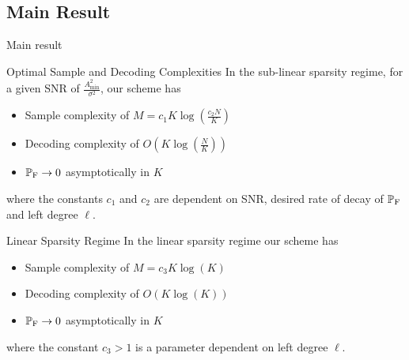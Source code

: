 \documentclass[10pt]{beamer}
\begin{document}
\subsection{Main Result}
\begin{frame}{Main result}

\begin{block}{Optimal Sample and Decoding Complexities}
In the sub-linear sparsity regime, for a given SNR of $\frac{A^{2}_{\text{min}}}{\sigma^{2}}$, our scheme has 
\begin{itemize}
\item Sample complexity of $M=c_1 K\log (\frac{c_2 N}{K})$
\item Decoding complexity of $O\left(K\log(\frac{N}{K})\right)$ 
\item $\mathbb{P}_{\text{F}}\rightarrow 0$ asymptotically in $K$
\end{itemize} 
where the constants $c_{1}$ and $c_{2}$ are dependent on SNR, desired rate of decay of $\mathbb{P}_{\text{F}}$ and left degree $\ell$.
\end{block}
\begin{block}{Linear Sparsity Regime}
In the linear sparsity regime our scheme has 
\begin{itemize}
\item Sample complexity of $M=c_3 K\log (K)$
\item Decoding complexity of $O\left(K\log(K)\right)$ 
\item $\mathbb{P}_{\text{F}}\rightarrow 0$ asymptotically in $K$
\end{itemize} 
where the constant $c_{3}>1$ is a parameter dependent on left degree $\ell$.
\end{block}
\end{frame}
\end{document}
